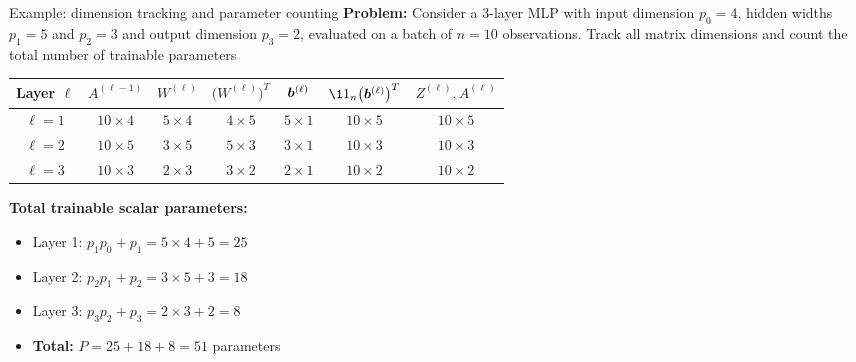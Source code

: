 \documentclass[aspectratio=169]{beamer}\usepackage[]{graphicx}\usepackage[]{xcolor}
\begin{document}
\begin{frame}{Example: dimension tracking and parameter counting}
\textbf{Problem:} Consider a 3-layer MLP with input dimension $p_0 = 4$, hidden widths $p_1 = 5$ and $p_2 = 3$ and output dimension $p_3 = 2$, evaluated on a batch of $n = 10$ observations. Track all matrix dimensions and count the total number of trainable parameters
\vfill
\begin{center}
\renewcommand{\arraystretch}{1.25}
\begin{tabular}{ccccccc}
\toprule
Layer $\ell$ & $A^{(\ell-1)}$ & $W^{(\ell)}$ & $\big(W^{(\ell)}\big)^T$ & $\bm{b}^{(\ell)}$ & $\11_n\big(\bb^{(\ell)}\big)^T$ & $Z^{(\ell)}, A^{(\ell)}$ \\
\midrule
$\ell = 1$ & $10 \times 4$ & $5 \times 4$ & $4 \times 5$ & $5 \times 1$ & $10 \times 5$ & $10 \times 5$ \\
$\ell = 2$ & $10 \times 5$ & $3 \times 5$ & $5 \times 3$ & $3 \times 1$ & $10 \times 3$ & $10 \times 3$ \\
$\ell = 3$ & $10 \times 3$ & $2 \times 3$ & $3 \times 2$ & $2 \times 1$ & $10 \times 2$ & $10 \times 2$ \\
\bottomrule
\end{tabular}
\end{center}
\vfill
\textbf{Total trainable scalar parameters:}
\begin{itemize}
\item Layer 1: $p_1 p_0 + p_1 = 5 \times 4 + 5 = 25$
\item Layer 2: $p_2 p_1 + p_2 = 3 \times 5 + 3 = 18$
\item Layer 3: $p_3 p_2 + p_3 = 2 \times 3 + 2 = 8$
\item \textbf{Total:} $P = 25 + 18 + 8 = 51$ parameters
\end{itemize}
\end{frame}
\end{document}

